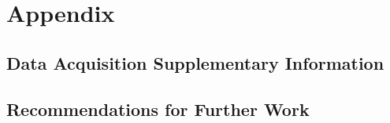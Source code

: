 \chapter{Appendix}

\section{Data Acquisition Supplementary Information}


\section{Recommendations for Further Work}

